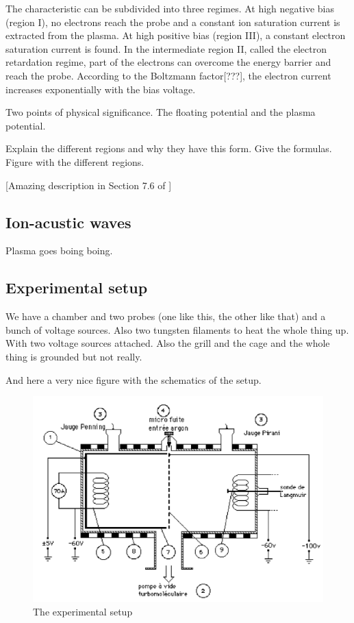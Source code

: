 The characteristic can be subdivided into three regimes. At high negative bias (region I), no electrons reach the probe and a constant ion saturation current is extracted from the plasma. 
At high positive bias (region III), a constant electron saturation current is found. 
In the intermediate region II, called the electron retardation regime, part of the electrons can overcome the energy barrier and reach the probe. 
According to the Boltzmann factor[???], the electron current increases exponentially with the bias voltage.

Two points of physical significance.
The floating potential and the plasma potential.

Explain the different regions and why they have this form.
Give the formulas.
Figure with the different regions.

[Amazing description in Section 7.6 of \cite{piel_plasma_2017}]

\subsection{Ion-acustic waves}
Plasma goes boing boing.

\subsection{Experimental setup}
We have a chamber and two probes (one like this, the other like that) and a bunch of voltage sources.
Also two tungsten filaments to heat the whole thing up.
With two voltage sources attached.
Also the grill and the cage and the whole thing is grounded but not really.

And here a very nice figure with the schematics of the setup.
\begin{figure}
    \centering
    \includegraphics[width=12cm]{figures/experimental-setup.png}
    \caption{The experimental setup}
    \label{fig:experimental_setup}
\end{figure}